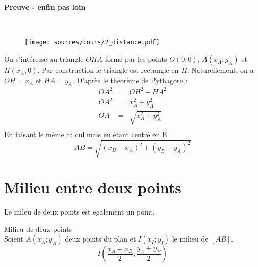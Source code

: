 \documentclass[paper=a4, fontsize=9pt]{scrartcl} %
\begin{document}
\begin{multicols}{2}

  \paragraph{Preuve - enfin pas loin}~~\\

  \begin{figure}[H]
    \centering
    \texttt{[image: sources/cours/2\_distance.pdf]}
  \end{figure}

  On s'intéresse au triangle $OHA$ formé par les points $O(0;0)$, $A(x_A ; y_A)$ et $H(x_A,0)$. Par construction le triangle est rectangle en $H$. Naturellement, on a $OH = x_A $ et $HA = y_A$. D'après le théorème de Pythagore :
  \begin{eqnarray*}
    OA^2 &=& OH^2 + HA^2 \\
    OA^2 &=& x_{A}^{2} + y_{A}^{2}\\
    OA &=& \sqrt{x_{A}^{2} + y_{A}^{2}}\\
  \end{eqnarray*}
  En faisant le même calcul mais en étant centré en B.
  $$AB   = \sqrt{(x_B - x_A)^{2} + (y_B - y_A) ^{2}}$$
\end{multicols}

\section{Milieu entre deux points}

Le mileu de deux points est également un point.

\begin{Proposition}Milieu de deux points\\
  Soient $A(x_A; y_A)$ deux points du plan et $I(x_I; y_I)$ le milieu de $[AB]$. 
  $$I \left(\dfrac{x_A + x_B}{2} ; \dfrac{y_A + y_B}{2} \right) $$
\end{Proposition}
\end{document}
